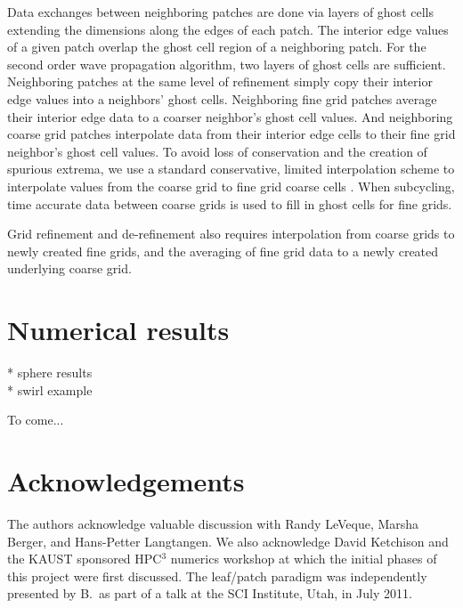 \documentclass{IOS-Book-Article}     %
\begin{document}
Data exchanges between neighboring patches are done via layers of
ghost cells extending the dimensions along the edges of each patch.
The interior edge values of a given patch overlap the ghost cell
region of a neighboring patch.  For the second order wave propagation
algorithm, two layers of ghost cells are sufficient.  Neighboring
patches at the same level of refinement simply copy their interior
edge values into a neighbors' ghost cells.  Neighboring fine grid
patches average their interior edge data to a coarser neighbor's ghost
cell values.  And neighboring coarse grid patches interpolate data
from their interior edge cells to their fine grid neighbor's ghost
cell values.  To avoid loss of conservation and the creation of
spurious extrema, we use a standard conservative, limited
interpolation scheme to interpolate values from the coarse grid to
fine grid coarse cells \cite{amrclaw, chombo}.  When subcycling, time accurate
data between coarse grids is used to fill in ghost cells for fine grids.

Grid refinement and de-refinement also requires interpolation from coarse grids
to newly created fine grids, and the averaging of fine grid data to a newly created
underlying coarse grid.

\section{Numerical results}

* sphere results\\
* swirl example

To come...


\section*{Acknowledgements}

The authors acknowledge valuable discussion with Randy LeVeque, Marsha Berger,
and Hans-Petter Langtangen.  We also acknowledge David Ketchison and the KAUST sponsored HPC$^3$
numerics workshop at which the initial phases of this project were first discussed.
The leaf/patch paradigm was independently presented
by B.\ as part of a talk at the SCI Institute, Utah, in July 2011.




\end{document}
